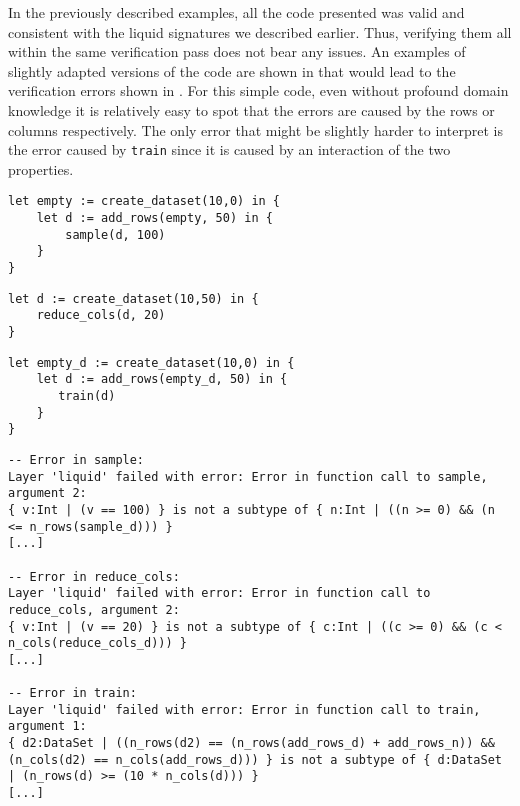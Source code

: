 In the previously described examples, all the code presented was valid and consistent with the liquid signatures we described earlier. Thus, verifying them all within the same verification pass does not bear any issues. An examples of slightly adapted versions of the code are shown in  that would lead to the verification errors shown in . For this simple code, even without profound domain knowledge it is relatively easy to spot that the errors are caused by the rows or columns respectively. The only error that might be slightly harder to interpret is the error caused by \texttt{train} since it is caused by an interaction of the two properties.

\begin{minipage}{.45\textwidth}
\begin{lstlisting}[caption={Adapted version of \Cref{lst:uc2_code1}},label={lst:uc2_code1_fail}]
let empty := create_dataset(10,0) in {
    let d := add_rows(empty, 50) in {
        sample(d, 100)
    }
}
\end{lstlisting}
\end{minipage}\hfill%
\begin{minipage}{.45\textwidth}
\begin{lstlisting}[caption={Adapted version of \Cref{lst:uc2_code2}},label={lst:uc2_code2_fail}]
let d := create_dataset(10,50) in {
    reduce_cols(d, 20)
}
\end{lstlisting}	
\end{minipage}

\begin{center}
\begin{minipage}{0.5\textwidth}
\begin{lstlisting}[caption={Adapted version of \Cref{lst:uc2_code3}},label={lst:uc2_code3_fail}]
let empty_d := create_dataset(10,0) in {
    let d := add_rows(empty_d, 50) in {
       train(d)
    }
}
\end{lstlisting}
\end{minipage}
\end{center}

\begin{lstlisting}[caption={Error messages when using one monolithic liquid layer},label={lst:uc2_errors_monolithic},numbers=none]
-- Error in sample:
Layer 'liquid' failed with error: Error in function call to sample, argument 2:
{ v:Int | (v == 100) } is not a subtype of { n:Int | ((n >= 0) && (n <= n_rows(sample_d))) }
[...]

-- Error in reduce_cols:
Layer 'liquid' failed with error: Error in function call to reduce_cols, argument 2:
{ v:Int | (v == 20) } is not a subtype of { c:Int | ((c >= 0) && (c < n_cols(reduce_cols_d))) }
[...]

-- Error in train:
Layer 'liquid' failed with error: Error in function call to train, argument 1:
{ d2:DataSet | ((n_rows(d2) == (n_rows(add_rows_d) + add_rows_n)) && (n_cols(d2) == n_cols(add_rows_d))) } is not a subtype of { d:DataSet | (n_rows(d) >= (10 * n_cols(d))) }
[...]
\end{lstlisting}

